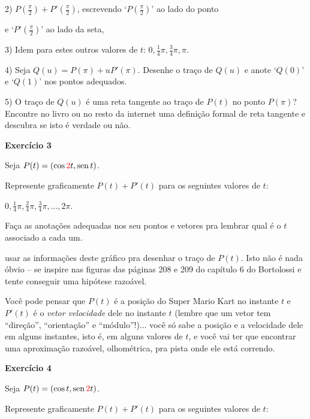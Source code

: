 \documentclass[oneside,12pt]{article}
\begin{document}
2) $P(\frac{π}{2}) + P'(\frac{π}{2})$, escrevendo `$P(\frac{π}{2})$'
ao lado do ponto

e `$P'(\frac{π}{2})$' ao lado da seta,

3) Idem para estes outros valores de $t$: $0, \frac14π, \frac34π, π$.

4) Seja $Q(u) = P(π) + uP'(π)$. Desenhe o traço de $Q(u)$ e anote
`$Q(0)$' e `$Q(1)$' nos pontos adequados.

\msk

5) O traço de $Q(u)$ é uma reta tangente ao traço de $P(t)$ no ponto
$P(π)$? Encontre no livro ou no resto da internet uma definição formal
de reta tangente e descubra se isto é verdade ou não.


\newpage


{\bf Exercício 3}

Seja $P(t) = (\cos \ColorRed{2}t, \sen t)$.

Represente graficamente $P(t)+P'(t)$ para os seguintes valores de $t$:

$0, \frac14π, \frac24π, \frac34π, \ldots, 2π$.

Faça as anotações adequadas nos seu pontos e vetores pra lembrar qual
é o $t$ associado a cada um.

\msk

 usar as informações deste gráfico pra desenhar o
traço de $P(t)$. Isto não é nada óbvio -- se inspire nas figuras das
páginas 208 e 209 do capítulo 6 do Bortolossi e tente conseguir uma
hipótese razoável.

Você pode pensar que $P(t)$ é a posição do Super Mario Kart no
instante $t$ e $P'(t)$ é o {\sl vetor velocidade} dele no instante $t$
(lembre que um vetor tem ``direção'', ``orientação'' e ``módulo''!)...
você só sabe a posição e a velocidade dele em alguns instantes, isto
é, em alguns valores de $t$, e você vai ter que encontrar uma
aproximação razoável, olhométrica, pra pista onde ele está correndo.




\newpage


{\bf Exercício 4}

Seja $P(t) = (\cos t, \sen \ColorRed{2}t)$.

Represente graficamente $P(t)+P'(t)$ para os seguintes valores de $t$:
\end{document}
